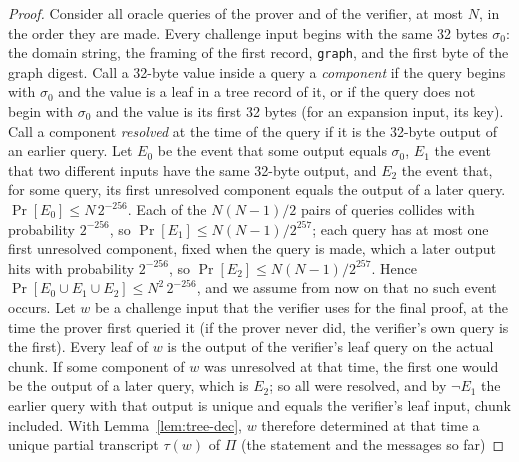 \begin{proof}
Consider all oracle queries of the prover and of the verifier, at most $N$, in the order they are
made. Every challenge input begins with the same 32 bytes $\sigma_0$: the domain string, the framing
of the first record, \texttt{graph}, and the first byte of the graph digest. Call a 32-byte value
inside a query a \emph{component} if the query begins with $\sigma_0$ and the value is a leaf in a
tree record of it, or if the query does not begin with $\sigma_0$ and the value is its first 32 bytes
(for an expansion input, its key). Call a component \emph{resolved} at the time of the query if it is
the 32-byte output of an earlier query.
Let $E_0$ be the event that some output equals $\sigma_0$, $E_1$ the event that two different inputs
have the same 32-byte output, and $E_2$ the event that, for some query, its first unresolved
component equals the output of a later query. $\Pr[E_0]\le N\,2^{-256}$. Each of the $N(N-1)/2$ pairs
of queries collides with probability $2^{-256}$, so $\Pr[E_1]\le N(N-1)/2^{257}$; each query has at
most one first unresolved component, fixed when the query is made, which a later output hits with
probability $2^{-256}$, so $\Pr[E_2]\le N(N-1)/2^{257}$. Hence $\Pr[E_0\cup E_1\cup E_2]\le
N^2\,2^{-256}$, and we assume from now on that no such event occurs.
Let $w$ be a challenge input that the verifier uses for the final proof, at the time the prover
first queried it (if the prover never did, the verifier's own query is the first). Every leaf of
$w$ is the output of the verifier's leaf query on the actual chunk. If some component of $w$ was
unresolved at that time, the first one would be the output of a later query, which is $E_2$; so all
were resolved, and by $\neg E_1$ the earlier query with that output is unique and equals the
verifier's leaf input, chunk included. With Lemma~\ref{lem:tree-dec}, $w$ therefore determined at
that time a unique partial transcript $\tau(w)$ of $\Pi$ (the statement and the messages so far)

\end{proof}
